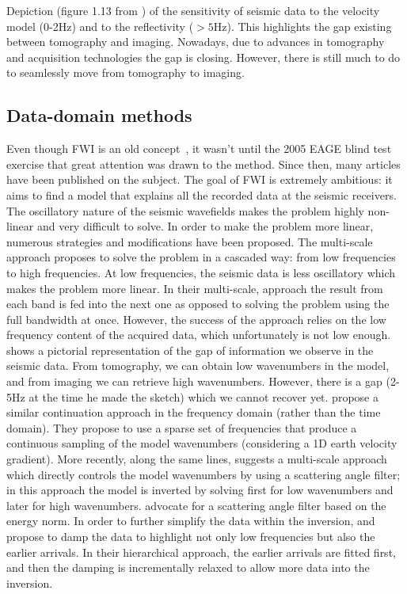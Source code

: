 %
{Depiction (figure 1.13 from \cite{Claerbout:1985:IEI:3887}) of 
 the sensitivity of seismic data to the velocity model (0-2Hz) and to the reflectivity ($> 5$Hz). This highlights
the gap existing between tomography and imaging. Nowadays, due to advances in tomography and acquisition technologies
the gap is closing. However, there is still much to do to seamlessly move from tomography to 
imaging.}



\subsection{Data-domain methods}

Even though FWI is an old concept~\citep{lailly1983seismic,tarantola,
Pratt99,Sirgue,VirieuxFWI}, it wasn't until the 2005 EAGE blind test
exercise \citep{billette20052004} that great attention was drawn to
the method. Since then, many articles have been published on the
subject. The goal of FWI is extremely ambitious: it aims to find a
model that explains all the recorded data at the seismic receivers.
The oscillatory nature of the seismic wavefields makes the problem
highly non-linear and very difficult to solve. In order to make the
problem more linear, numerous strategies and modifications have
been proposed. The multi-scale approach \citep{Bunks95} proposes to
solve the problem in a cascaded way: from low frequencies to high
frequencies. At low frequencies, the seismic data is less oscillatory
which makes the problem more linear. In their multi-scale, approach
the result from each band is fed into the next one as opposed to
solving the problem using the full bandwidth at once. However, the
success of the approach relies on the low frequency content of the
acquired data, which unfortunately is not low enough. 
\citep{Claerbout:1985:IEI:3887} shows a pictorial representation
of the gap of information we observe in the seismic data. From
tomography, we can obtain low wavenumbers in the model, and from
imaging we can retrieve high wavenumbers. However, there is a gap
(2-5Hz at the time he made the sketch) which we cannot recover
yet. \cite{Sirgue} propose a similar continuation approach in the
frequency domain (rather than the time domain). They propose to use a
sparse set of frequencies that produce a continuous sampling of the
model wavenumbers (considering a 1D earth velocity gradient). More
recently, along the same lines, \cite{TariqWavenumber} suggests a
multi-scale approach which directly controls the model wavenumbers
by using a scattering angle filter; in this approach the model is
inverted by solving first for low wavenumbers and later for high
wavenumbers. \cite{Rocha2015elastic} advocate for a scattering angle
filter based on the energy norm. In order to further simplify the
data within the inversion, \cite{ShinHa.geo.2008} and \cite{shin_cha}
propose to damp the data to highlight not only low frequencies
but also the earlier arrivals. In their hierarchical approach,
the earlier arrivals are fitted first, and then the damping is
incrementally relaxed to allow more data into the inversion.

